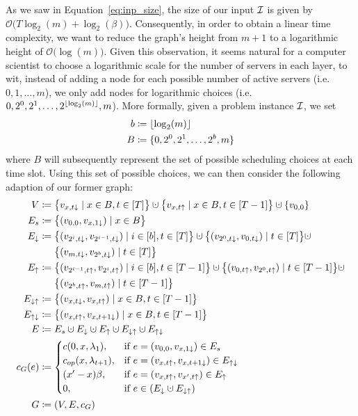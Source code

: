 As we saw in Equation~\eqref{eq:inp_size}, the size of our input $\mathcal{I}$ is given by $\mathcal{O}\bigl(T\log_2(m)+\log_2(\beta)\bigr)$. Consequently, in order to obtain a linear time complexity, we want to reduce the graph's height from $m+1$ to a logarithmic height of $\mathcal{O}\bigl(\log(m)\bigr)$. Given this observation, it seems natural for a computer scientist to choose a logarithmic scale for the number of servers in each layer, to wit, instead of adding a node for each possible number of active servers (i.e.\ $0,1,\dotsc,m$), we only add nodes for logarithmic choices (i.e.\ $0,2^0,2^1,\dotsc,2^{\lfloor\log_2(m)\rfloor},m$). More formally, given a problem instance $\mathcal{I}$, we set
\begin{align*}
	b&\coloneqq\lfloor\log_2(m)\rfloor\\
	B&\coloneqq\{0,2^0,2^1,\dotsc,2^b,m\}
\end{align*}
where $B$ will subsequently represent the set of possible scheduling choices at each time slot. Using this set of possible choices, we can then consider the following adaption of our former graph:
\begin{align*}
	V&\coloneqq\bigl\{v_{x,t\downarrow}\mid x\in B,t\in[T]\bigr\}\dotcup\bigl\{v_{x,t\uparrow}\mid x\in B, t\in[T-1]\bigr\}\dotcup\{v_{0,0}\}\\
	E_s&\coloneqq\bigl\{(v_{0,0},v_{x,1\downarrow})\mid x\in B\bigr\}\\
	E_\downarrow&\coloneqq\bigl\{(v_{2^i,t\downarrow},v_{2^{i-1},t\downarrow})\mid i\in[b],t\in[T]\bigr\}\dotcup\bigl\{(v_{2^0,t\downarrow},v_{0,t\downarrow})\mid t\in[T]\bigr\}\dotcup\\
	&\phantom{{}\coloneqq{}}\bigl\{(v_{m,t\downarrow},v_{2^b,t\downarrow})\mid t\in[T]\bigr\}\\
	E_\uparrow&\coloneqq\bigl\{(v_{2^{i-1},t\uparrow},v_{2^i,t\uparrow})\mid i\in[b],t\in[T-1]\bigr\}\dotcup\bigl\{(v_{0,t\uparrow},v_{2^0,t\uparrow})\mid t\in[T-1]\bigr\}\dotcup\\
	&\phantom{{}\coloneqq{}}\bigl\{(v_{2^b,t\uparrow},v_{m,t\uparrow})\mid t\in[T-1]\bigr\}\\
	E_{\downarrow\uparrow}&\coloneqq\bigl\{(v_{x,t\downarrow},v_{x,t\uparrow})\mid x\in B,t\in[T-1]\bigr\}\\
	E_{\uparrow\downarrow}&\coloneqq\bigl\{(v_{x,t\uparrow},v_{x,t+1\downarrow})\mid x\in B,t\in[T-1]\bigr\}\\
	E&\coloneqq E_s\dotcup E_\downarrow\dotcup E_\uparrow\dotcup E_{\downarrow\uparrow}\dotcup E_{\uparrow\downarrow}\\
	c_G(e)&\coloneqq
	\begin{cases}
		\costs(0,x,\lambda_1), & \text{if $e=(v_{0,0},v_{x,1\downarrow})\in E_s$}\\
		\opcosts(x,\lambda_{t+1}), & \text{if $e=(v_{x,t\uparrow},v_{x,t+1\downarrow})\in E_{\uparrow\downarrow}$}\\
		(x'-x)\beta, & \text{if $e=(v_{x,t\uparrow},v_{x',t\uparrow})\in E_\uparrow$}\\
		0, & \text{if $e\in(E_\downarrow\dotcup E_{\downarrow\uparrow})$}
	\end{cases}\\
	G&\coloneqq(V,E,c_G)
\end{align*}
